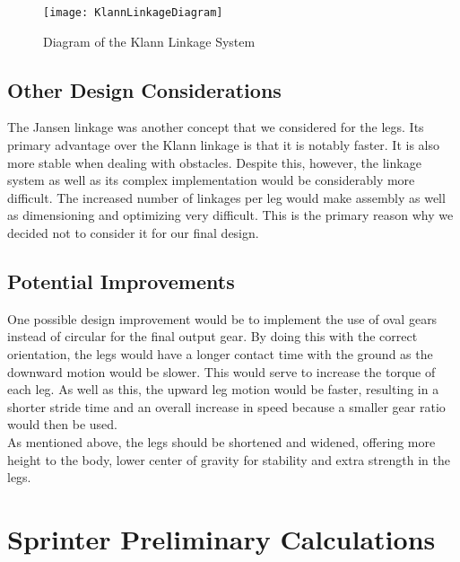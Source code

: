   \begin{figure}[H]
    \begin{center}
      \texttt{[image: KlannLinkageDiagram]}
      \caption{Diagram of the Klann Linkage System}
      \label{fig:klannLinkage1}
    \end{center}
  \end{figure}

  \subsection{Other Design Considerations}
  \label{sub:Other Design Considerations}
    The Jansen linkage was another concept that we considered for the legs. Its primary advantage over the Klann linkage is that it is notably faster. It is also more stable when dealing with obstacles. Despite this, however, the linkage system as well as its complex implementation would be considerably more difficult. The increased number of linkages per leg would make assembly as well as dimensioning and optimizing very difficult. This is the primary reason why we decided not to consider it for our final design.

  \subsection{Potential Improvements}
  \label{sub:Potential Improvements}
    One possible design improvement would be to implement the use of oval gears instead of circular for the final output gear. By doing this with the correct orientation, the legs would have a longer contact time with the ground as the downward motion would be slower. This would serve to increase the torque of each leg. As well as this, the upward leg motion would be faster, resulting in a shorter stride time and an overall increase in speed because a smaller gear ratio would then be used.\\

    As mentioned above, the legs should be shortened and widened, offering more height to the body, lower center of gravity for stability and extra strength in the legs.

\clearpage
\section{Sprinter Preliminary Calculations}
\label{sec:Sprinter Preliminary Calculations}

